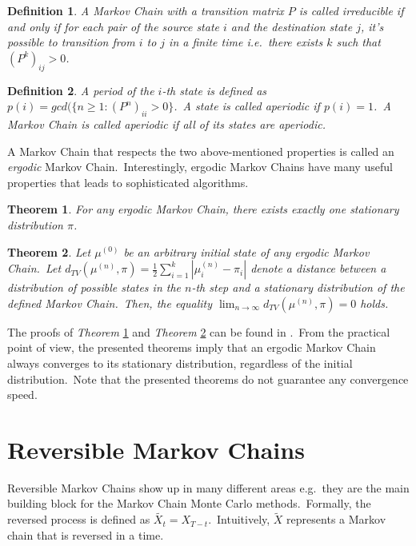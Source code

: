 \documentclass[a4paper, 11pt, onecolumn, openany, titlepage]{report}
\theoremstyle{default_theorem_style}\newtheorem{theorem}{Theorem}
\theoremstyle{default_theorem_style}\newtheorem{definition}{Definition}
\begin{document}
\begin{definition}
A Markov Chain with a transition matrix $P$ is called \textit{irreducible} if and only if for each pair of the source
state $i$ and the destination state $j$, it's possible to transition from $i$ to $j$ in a finite time i.e.\ there
exists $k$ such that $(P^k)_{ij} > 0$.
\end{definition}

\begin{definition}
A period of the $i$-th state is defined as $p(i) = gcd(\{n \geq 1 : (P^n)_{ii} > 0\}$.\ A state is called
\textit{aperiodic} if $p(i) = 1$.\ A Markov Chain is called aperiodic if all of its states are aperiodic.
\end{definition}

A Markov Chain that respects the two above-mentioned properties is called an \textit{ergodic} Markov
Chain.\ Interestingly, ergodic Markov Chains have many useful properties that leads to sophisticated algorithms.

\begin{theorem}\label{thm:one_stationary}
For any ergodic Markov Chain, there exists exactly one stationary distribution $\pi$.
\end{theorem}

\begin{theorem}\label{thm:converges_to_stationary}
Let $\mu^{(0)}$ be an arbitrary initial state of any ergodic Markov Chain.\ Let
$d_{TV}(\mu^{(n)}, \pi) = \frac{1}{2} \sum_{i = 1}^{k} |\mu_i^{(n)} - \pi_i|$ denote a distance between a
distribution of possible states in the $n$-th step and a stationary distribution of the defined Markov Chain.\ Then,
the equality $\lim_{n \to \infty} d_{TV}(\mu^{(n)}, \pi) = 0$ holds.
\end{theorem}

The proofs of \textit{Theorem} \ref{thm:one_stationary} and \textit{Theorem} \ref{thm:converges_to_stationary} can
be found in \cite{markov_chains_book}.\ From the practical point of view, the presented theorems imply that an
ergodic Markov Chain always converges to its stationary distribution, regardless of the initial
distribution.\ Note that the presented theorems do not guarantee any convergence speed.

\section{Reversible Markov Chains}

Reversible Markov Chains show up in many different areas e.g.\ they are the main building block for the Markov
Chain Monte Carlo methods.\ Formally, the reversed process is defined as $\tilde{X_t} = X_{T - t}$.\ Intuitively,
$\tilde{X}$ represents a Markov chain that is reversed in a time.
\end{document}
